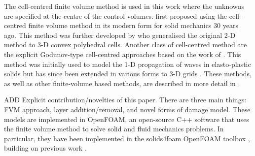 \documentclass[sn-mathphys,Numbered,draft]{sn-jnl}%
\begin{document}
The cell-centred finite volume method is used in this work where the unknowns are specified at the centre of the control volumes. \citet{demirdzic_numerical_1988}
 first proposed using the cell-centred finite volume method in its modern form for solid mechanics 30 years ago. This method was further developed by \citet{demirdzic_finite_1994} who generalised the original 2-D method to 3-D convex polyhedral cells. Another class of cell-centred method are the explicit Godunov-type cell-centred approaches based on the work of \citet{trangenstein_higher-order_1991}. This method was initially used to model the 1-D propagation of waves in elasto-plastic solids but has since been extended in various forms to 3-D grids \cite{sevilla_face-centred_2018,sevilla_locking-free_2018,lee_development_2013,haider_first-order_2017,haider_upwind_2018, maire_multi-scale_2009}. These methods, as well as other finite-volume based methods, are described in more detail in \citet{cardiff_thirty_2021}.




ADD Explicit contribution/novelties of this paper.
There are three main things: FVM approach, layer addition/removal, and novel forms of damage model.
These models are implemented in OpenFOAM, an open-source C++ software that uses the finite volume method to solve solid and fluid mechanics problems. In particular, they have been implemented in the solids4foam OpenFOAM toolbox \cite{Cardiff2018, Tukovic2018}, building on previous work \cite{cardiff_eulerian-inspired_2017-1, cardiff_lagrangian_2017}.
\end{document}
